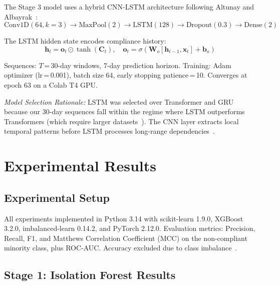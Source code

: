 \documentclass[conference]{IEEEtran}
\begin{document}
The Stage 3 model uses a hybrid CNN-LSTM architecture following 
Altunay and Albayrak~\cite{altunay2023}:
\begin{equation*}
  \text{Conv1D}(64,k{=}3) \to \text{MaxPool}(2) \to 
  \text{LSTM}(128) \to \text{Dropout}(0.3) \to \text{Dense}(2)
\end{equation*}

The LSTM hidden state encodes compliance history:
\begin{equation}
  \mathbf{h}_t = \mathbf{o}_t \odot \tanh(\mathbf{C}_t), \quad
  \mathbf{o}_t = \sigma(\mathbf{W}_o[\mathbf{h}_{t-1}, \mathbf{x}_t] + \mathbf{b}_o)
\end{equation}

Sequences: $T$\,=\,30-day windows, 7-day prediction horizon. 
Training: Adam optimizer ($\text{lr}$\,=\,0.001), batch size 64, 
early stopping patience\,=\,10. Converges at epoch 63 on a Colab T4 GPU.

\textit{Model Selection Rationale:} LSTM was selected over Transformer 
and GRU because our 30-day sequences fall within the regime where LSTM 
outperforms Transformers (which require larger datasets~\cite{guo2021}). 
The CNN layer extracts local temporal patterns before LSTM processes 
long-range dependencies~\cite{altunay2023}.

\section{Experimental Results}
\label{sec:results}

\subsection{Experimental Setup}
All experiments implemented in Python 3.14 with scikit-learn 1.9.0, 
XGBoost 3.2.0, imbalanced-learn 0.14.2, and PyTorch 2.12.0. 
Evaluation metrics: Precision, Recall, F1, and Matthews Correlation 
Coefficient (MCC) on the non-compliant minority class, plus ROC-AUC. 
Accuracy excluded due to class imbalance~\cite{sokolova2009}.

\subsection{Stage 1: Isolation Forest Results}
\end{document}

